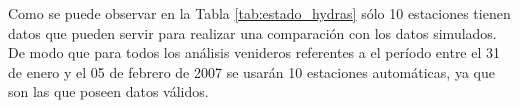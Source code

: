  Como se puede observar en la Tabla \ref{tab:estado_hydras} sólo 10 estaciones tienen datos que pueden servir para realizar una  comparación con los datos simulados. De modo que para todos los análisis venideros referentes a el período entre el 31 de enero y el 05 de febrero de 2007 se usarán 10 estaciones automáticas, ya que son las que poseen datos válidos.


